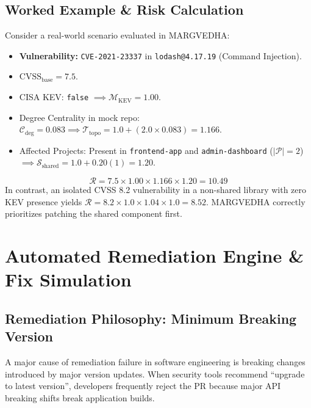 \documentclass[12pt,a4paper,oneside]{report}
\begin{document}
\section{Worked Example \& Risk Calculation}
Consider a real-world scenario evaluated in MARGVEDHA:
\begin{itemize}
    \item \textbf{Vulnerability:} \texttt{CVE-2021-23337} in \texttt{lodash@4.17.19} (Command Injection).
    \item $\text{CVSS}_{\text{base}} = 7.5$.
    \item CISA KEV: \texttt{false} $\implies \mathcal{M}_{\text{KEV}} = 1.00$.
    \item Degree Centrality in mock repo: $\mathcal{C}_{\text{deg}} = 0.083 \implies \mathcal{T}_{\text{topo}} = 1.0 + (2.0 \times 0.083) = 1.166$.
    \item Affected Projects: Present in \texttt{frontend-app} and \texttt{admin-dashboard} ($|\mathcal{P}| = 2$) $\implies \mathcal{S}_{\text{shared}} = 1.0 + 0.20(1) = 1.20$.
\end{itemize}
\begin{equation}
    \mathcal{R} = 7.5 \times 1.00 \times 1.166 \times 1.20 = \mathbf{10.49}
\end{equation}
In contrast, an isolated CVSS 8.2 vulnerability in a non-shared library with zero KEV presence yields $\mathcal{R} = 8.2 \times 1.0 \times 1.04 \times 1.0 = 8.52$. MARGVEDHA correctly prioritizes patching the shared component first.

\chapter{Automated Remediation Engine \& Fix Simulation}

\section{Remediation Philosophy: Minimum Breaking Version}
A major cause of remediation failure in software engineering is breaking changes introduced by major version updates. When security tools recommend ``upgrade to latest version'', developers frequently reject the PR because major API breaking shifts break application builds. 
\end{document}
